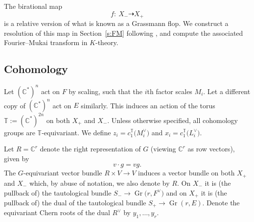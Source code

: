 \documentclass[pdftex]{sigma}
\numberwithin{equation}{section}
\newcommand{\CC}{\mathbb{C}}
\newcommand{\torus}{\mathbb{T}}
\DeclareMathOperator{\Gr}{Gr}
\newcommand{\F}{F}
\newcommand{\E}{E}
\newcommand{\MB}{M}
\newcommand{\LB}{L}
\newcommand{\z}{z}
\newcommand{\x}{x}
\newcommand{\y}{y}
\begin{document}
The birational map
\[
f\colon \ X_{-}\dashrightarrow X_{+}
\]
is a relative version of what is known as a Grassmann flop. We construct a resolution of this map in Section~\ref{s:FM} following \cite{BLV}, and compute the associated Fourier--Mukai transform in $K$-theory.

\subsection{Cohomology}\label{s:coh}
Let $(\CC^*)^n$ act on $\F$ by scaling, such that the $i$th factor scales $\MB_i$. Let a different copy of $(\CC^*)^n$ act on $\E$ similarly.
This induces an action of the torus $\torus:= (\CC^*)^{2n}$ on both $X_+$ and $X_-$. Unless otherwise specified, all cohomology groups are $\torus$-equivariant. We define $\z_i = c_1^\torus\bigl(\MB_i^\vee\bigr)$ and $\x_i = c_1^\torus\bigl(\LB_i^\vee\bigr)$.

Let $R = \CC^r$ denote the right representation of $G$ (viewing $\CC^r$ as row vectors), given by
\begin{equation} \label{e:srep}
v\cdot g = vg
.\end{equation}
The $G$-equivariant vector bundle $R \times V \to V$ induces a vector bundle on both $X_+$ and $X_-$ which, by abuse of notation, we also denote by $R$. On $X_-$ it is (the pullback of) the tautological bundle $S_- \to \Gr\bigl(r, \F^\vee\bigr)$ and on $X_+$ it is (the pullback of) the dual of the tautological bundle $S_+ \to \Gr(r, \E)$. Denote the equivariant Chern roots of the dual $R^\vee$ by $\y_1, \dots , \y_r$.
\end{document}
